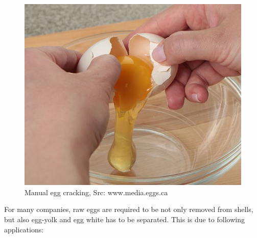 \documentclass[12pt,twoside,a4paper]{article}
\begin{document}
\begin{figure}[H]
\centering
\includegraphics[width=0.4\paperwidth]{crack}
\caption{Manual egg cracking, Src: www.media.eggs.ca}
\end{figure}

For many companies, raw eggs are required to be not only removed from shells, but also egg-yolk and egg white has to be separated.
This is due to following applications:
\end{document}
